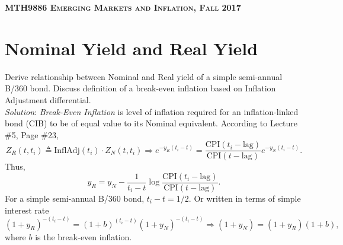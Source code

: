 \documentclass[paper=a4, fontsize=10pt,]{scrartcl} %
\theoremstyle{theorem}
\theoremstyle{remark}
\theoremstyle{example}
\numberwithin{equation}{section} %
\numberwithin{figure}{section} %
\numberwithin{table}{section} %
\begin{document}
	
{
\begin{center}
\scshape{}\selectfont \textsc{\textbf{MTH9886 Emerging Markets and Inflation, \hspace{2mm}Fall 2017}}
\end{center}
}



\section{Nominal Yield and Real Yield}
Derive relationship between Nominal and Real yield of a simple semi-annual B/360 bond. Discuss definition of a break-even inflation based
on Inflation Adjustment differential.\\
\textit{Solution}: \textit{Break-Even Inflation} is level of inflation required for an inflation-linked bond (CIB) to be of equal value to its Nominal equivalent. According to Lecture \#5, Page \#23,
$$
Z_R(t,t_i) \triangleq \text{InflAdj}(t_i)\cdot Z_N(t,t_i) \Rightarrow e^{-y_R (t_i -t)} = \frac{\text{CPI}(t_i-\text{lag})}{\text{CPI}(t-\text{lag})} e^{-y_N (t_i -t)}.
$$
Thus,
$$
y_R = y_N - \frac{1}{t_i -t}\log \frac{\text{CPI}(t_i-\text{lag})}{\text{CPI}(t-\text{lag})}.
$$
For a simple semi-annual B/360 bond, $t_i - t = 1/2$. Or written in terms of simple interest rate
$$
(1+y_R)^{-(t_i-t)} = (1+b)^{(t_i -t )}(1+y_N)^{-(t_i-t)} \Rightarrow (1+y_N) = (1+y_R)(1+b),
$$
where $b$ is the break-even inflation.
\end{document}
